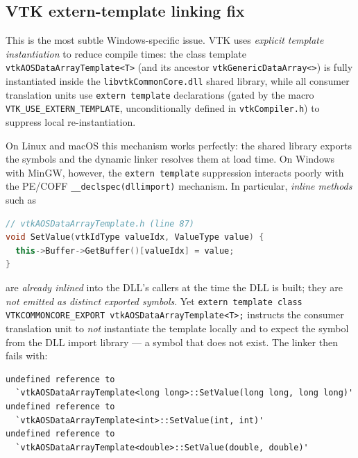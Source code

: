 \subsection{VTK extern-template linking fix}
\label{ssec:win-vtk-extern}

This is the most subtle Windows-specific issue.  VTK uses \emph{explicit
template instantiation} to reduce compile times: the class template
\texttt{vtkAOSDataArrayTemplate<T>} (and its ancestor
\texttt{vtkGenericDataArray<>}) is fully instantiated inside the
\texttt{libvtkCommonCore.dll} shared library, while all consumer translation
units use \texttt{extern template} declarations (gated by the macro
\texttt{VTK\_USE\_EXTERN\_TEMPLATE}, unconditionally defined in
\texttt{vtkCompiler.h}) to suppress local re-instantiation.

On Linux and macOS this mechanism works perfectly: the shared library exports
the symbols and the dynamic linker resolves them at load time.  On Windows
with MinGW, however, the \texttt{extern template} suppression interacts poorly
with the PE/COFF \texttt{\_\_declspec(dllimport)} mechanism.  In particular,
\emph{inline methods} such as

\begin{lstlisting}[language=C++, basicstyle=\ttfamily\small,
    frame=single, framerule=0.4pt, rulecolor=\color{gray!50},
    breaklines=true, showstringspaces=false]
// vtkAOSDataArrayTemplate.h (line 87)
void SetValue(vtkIdType valueIdx, ValueType value) {
  this->Buffer->GetBuffer()[valueIdx] = value;
}
\end{lstlisting}

are \emph{already inlined} into the DLL's callers at the time the DLL is
built; they are \emph{not emitted as distinct exported symbols}.  Yet
\texttt{extern template class VTKCOMMONCORE\_EXPORT
vtkAOSDataArrayTemplate<T>;} instructs the consumer translation unit to
\emph{not} instantiate the template locally and to expect the symbol from the
DLL import library --- a symbol that does not exist.  The linker then fails
with:
\begin{lstlisting}[basicstyle=\ttfamily\small, frame=single,
    framerule=0.4pt, rulecolor=\color{gray!50}, breaklines=true,
    showstringspaces=false]
undefined reference to
  `vtkAOSDataArrayTemplate<long long>::SetValue(long long, long long)'
undefined reference to
  `vtkAOSDataArrayTemplate<int>::SetValue(int, int)'
undefined reference to
  `vtkAOSDataArrayTemplate<double>::SetValue(double, double)'
\end{lstlisting}

